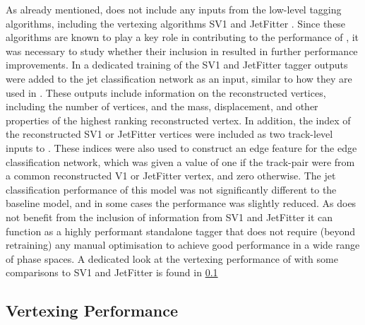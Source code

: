 As already mentioned, \GNN does not include any inputs from the low-level tagging algorithms, including the vertexing algorithms SV1 and JetFitter \cite{FTAG-2018-01}.
Since these algorithms are known to play a key role in contributing to the performance of \DLr, it was necessary to study whether their inclusion in \GNN resulted in further performance improvements.
In a dedicated training of \GNN the SV1 and JetFitter tagger outputs were added to the \GNN jet classification network as an input, similar to how they are used in \DLr.
These outputs include information on the reconstructed vertices, including the number of vertices, and the mass, displacement, and other properties of the highest ranking reconstructed vertex.
In addition, the index of the reconstructed SV1 or JetFitter vertices were included as two track-level inputs to \GNN. 
These indices were also used to construct an edge feature for the edge classification network, which was given a value of one if the track-pair were from a common reconstructed V1 or JetFitter vertex, and zero otherwise.
The jet classification performance of this \GNN model was not significantly different to the baseline model, and in some cases the performance was slightly reduced.
As \GNN does not benefit from the inclusion of information from SV1 and JetFitter it can function as a highly performant standalone tagger that does not require (beyond retraining) any manual optimisation to achieve good performance in a wide range of phase spaces.
A dedicated look at the vertexing performance of \GNN with some comparisons to SV1 and JetFitter is found in \cref{sec:gnn_vert_perf}



\subsection{Vertexing Performance}\label{sec:gnn_vert_perf}

